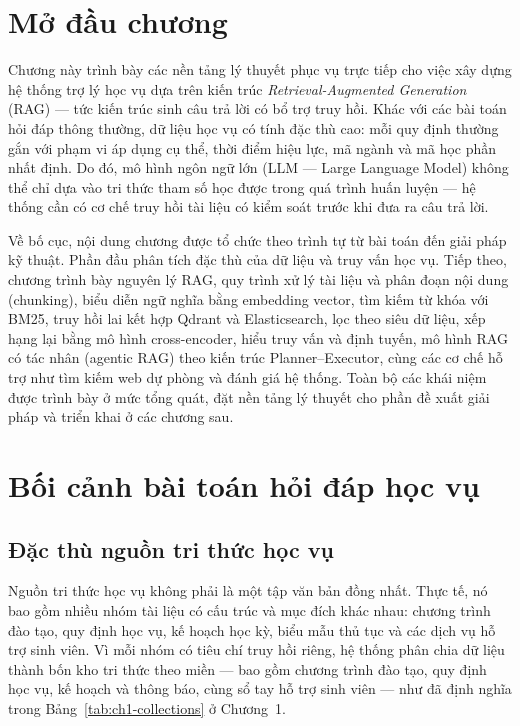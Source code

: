 \documentclass[../DoAn.tex]{subfiles}
\begin{document}
\section{Mở đầu chương}

Chương này trình bày các nền tảng lý thuyết phục vụ trực tiếp cho việc xây
dựng hệ thống trợ lý học vụ dựa trên kiến trúc \textit{Retrieval-Augmented
Generation} (RAG) --- tức kiến trúc sinh câu trả lời có bổ trợ truy hồi. Khác
với các bài toán hỏi đáp thông thường, dữ liệu học vụ có tính đặc thù cao:
mỗi quy định thường gắn với phạm vi áp dụng cụ thể, thời điểm hiệu lực, mã
ngành và mã học phần nhất định. Do đó, mô hình ngôn ngữ lớn (LLM --- Large
Language Model) không thể chỉ dựa vào tri thức tham số học được trong quá
trình huấn luyện --- hệ thống cần có cơ chế truy hồi tài liệu có kiểm soát
trước khi đưa ra câu trả lời.

Về bố cục, nội dung chương được tổ chức theo trình tự từ bài toán đến giải
pháp kỹ thuật. Phần đầu phân tích đặc thù của dữ liệu và truy vấn học vụ.
Tiếp theo, chương trình bày nguyên lý RAG, quy trình xử lý tài liệu và phân
đoạn nội dung (chunking), biểu diễn ngữ nghĩa bằng embedding vector, tìm kiếm
từ khóa với BM25, truy hồi lai kết hợp Qdrant và Elasticsearch, lọc theo siêu
dữ liệu, xếp hạng lại bằng mô hình cross-encoder, hiểu truy vấn và định tuyến,
mô hình RAG có tác nhân (agentic RAG) theo kiến trúc Planner--Executor, cùng
các cơ chế hỗ trợ như tìm kiếm web dự phòng và đánh giá hệ thống. Toàn bộ
các khái niệm được trình bày ở mức tổng quát, đặt nền tảng lý thuyết cho phần
đề xuất giải pháp và triển khai ở các chương sau.

\section{Bối cảnh bài toán hỏi đáp học vụ}

\subsection{Đặc thù nguồn tri thức học vụ}

Nguồn tri thức học vụ không phải là một tập văn bản đồng nhất. Thực tế, nó
bao gồm nhiều nhóm tài liệu có cấu trúc và mục đích khác nhau: chương trình
đào tạo, quy định học vụ, kế hoạch học kỳ, biểu mẫu thủ tục và các dịch vụ
hỗ trợ sinh viên. Vì mỗi nhóm có tiêu chí truy hồi riêng, hệ thống phân chia
dữ liệu thành bốn kho tri thức theo miền --- bao gồm chương trình đào tạo, quy
định học vụ, kế hoạch và thông báo, cùng sổ tay hỗ trợ sinh viên --- như đã
định nghĩa trong Bảng~\ref{tab:ch1-collections} ở Chương~1.
\end{document}
